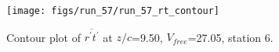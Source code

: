\begin{figure}[H]
\centering
\texttt{[image: figs/run\_57/run\_57\_rt\_contour]}
\caption{Contour plot of $\overline{r^\prime t^\prime}$ at $z/c$=9.50, $V_{free}$=27.05, station 6.}
\end{figure}


